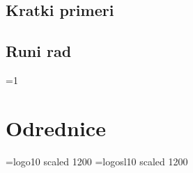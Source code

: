 \documentclass[12pt, twoside, a4paper]{article}
\def\navod#1{\leavevmode\setbox\qqbox\hbox{``}\hbox to \wd\qqbox{,\hss,}#1\hbox to \wd\qqbox{`\hss`}}
\begin{document}
\subsection{Kratki primeri}










\newpage

\subsection{Ru{\cv}ni rad}






\def\alphainsection{0}

\let\oldsection=\section
\def\section{%
  \ifnum\alphainsection=1%
    \addtocounter{alphasect}{1}
  \fi%
\oldsection}%

\renewcommand\thesection{%
 \ifnum\alphainsection=1%
   \Alph{alphasect}%
 \else
   \arabic{section}%
 \fi%
}%

\newenvironment{alphasection}{%
  \ifnum\alphainsection=1%
    \errhelp={Let other blocks end at the beginning of the next block.}
    \errmessage{Nested Alpha section not allowed}
  \fi%
  \setcounter{alphasect}{0}
  \def\alphainsection{1}
}{%
  \setcounter{alphasect}{0}
  \def\alphainsection{0}
}%



% 


\section{Odrednice}


\renewcommand{\labelenumi}{[{\it\arabic{enumi}\/}]}
\def\lit#1#2#3(#4){\item #1: {\navod{#2}},
  \def\vol{#3}\ifx\vol\empty\else {\sl\vol\/} \fi (#4)}
\font\logoten=logo10 scaled 1200
\font\logoteni=logosl10 scaled 1200
\def\MP{{\logoten META}\-{\logoten POST}}
\def\link#1#2{\item\href{#1}{#2}\hfill\break{\footnotesize\url{#1}}}
\end{document}
